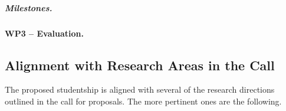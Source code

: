 \documentclass[10pt]{article}
\begin{document}
\subparagraph{Milestones.}



\paragraph{WP3 -- Evaluation.}  















\subsection*{Alignment with Research Areas in the Call}

The proposed studentship is aligned with several of the research directions outlined in the call for proposals. The more pertinent ones are the following. 
\end{document}
